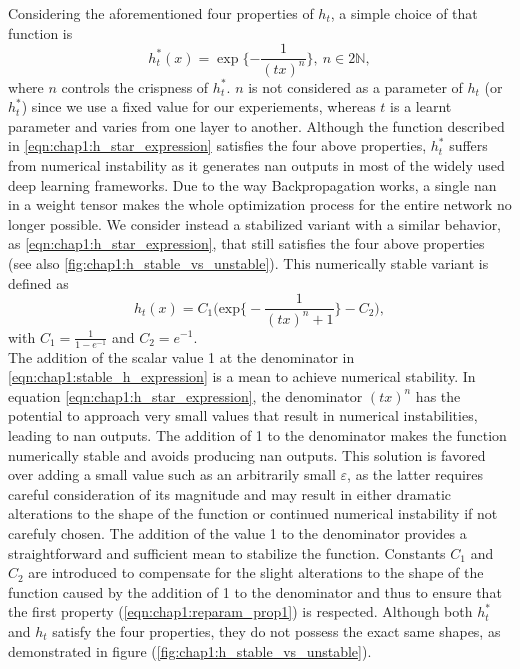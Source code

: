 Considering the aforementioned four properties of $h_t$, a simple choice of that
function is 
\begin{equation}
  \label{eqn:chap1:h_star_expression}
  h_t^*(x) = \exp\bigg\{{-\displaystyle\frac{1}{(tx)^n}}\bigg\}, ~ n\in 2\mathds{N},
\end{equation}
\noindent where $n$ controls the crispness of $h_t^*$. $n$ is not considered as
a parameter of $h_t$ (or $h_t^*$) since we use a fixed value for our
experiements, whereas $t$ is a learnt parameter and varies from one layer to
another. Although the function described in \cref{eqn:chap1:h_star_expression}
satisfies the four above properties, $h_t^*$ suffers from numerical instability
as it generates \ac{nan} outputs in most of the widely used deep learning
frameworks. Due to the way Backpropagation works, a single \ac{nan} in a weight
tensor makes the whole optimization process for the entire network no longer
possible. We consider instead a stabilized variant with a similar behavior, as
\cref{eqn:chap1:h_star_expression},  that still satisfies the four above
properties (see also \cref{fig:chap1:h_stable_vs_unstable}). This numerically
stable variant is  defined as 
\begin{equation}
  \label{eqn:chap1:stable_h_expression}
  h_t(x) = C_1 \biggl( \text{exp} \bigg\{-\displaystyle\frac{1}{(tx)^n +1}\bigg\} - C_2 \biggr),
\end{equation}
\noindent with $C_1=\frac{1}{1-e^{-1}}$ and $C_2 = e^{-1}$.\\

The addition of the scalar value 1 at the denominator in
\cref{eqn:chap1:stable_h_expression} is a mean to achieve numerical stability.
In equation \cref{eqn:chap1:h_star_expression}, the denominator $(tx)^n$ has the
potential to approach very small values that result in numerical instabilities,
leading to \ac{nan} outputs. The addition of 1 to the denominator makes the
function numerically stable and avoids producing \ac{nan} outputs. This solution
is favored over adding a small value such as an arbitrarily small $\varepsilon$,
as the latter requires careful consideration of its magnitude and may result in
either dramatic alterations to the shape of the function or continued numerical
instability if not carefuly chosen. The addition of the value 1 to the
denominator provides a straightforward and sufficient mean to stabilize the
function. Constants $C_1$ and $C_2$ are introduced to compensate for the slight
alterations to the shape of the function caused by the addition of 1 to the
denominator and thus to ensure that the first property
(\cref{eqn:chap1:reparam_prop1}) is respected. Although both $h_t^*$ and $h_t$
satisfy the four properties, they do not possess the exact same shapes, as
demonstrated in figure (\ref{fig:chap1:h_stable_vs_unstable}).\\

